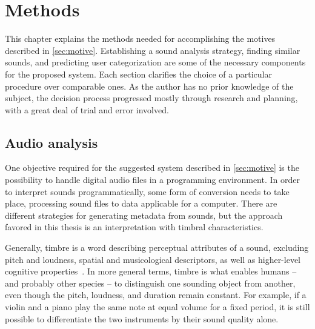 \bgroup{}

\chapter{Methods}\label{cha:methods}
This chapter explains the methods needed for accomplishing the motives described in \cref{sec:motive}. Establishing a sound analysis strategy, finding similar sounds, and predicting user categorization are some of the necessary components for the proposed system. Each section clarifies the choice of a particular procedure over comparable ones. As the author has no prior knowledge of the subject, the decision process progressed mostly through research and planning, with a great deal of trial and error involved.

\section{Audio analysis}\label{sec:audio_analysis}
One objective required for the suggested system described in \cref{sec:motive} is the possibility to handle digital audio files in a programming environment. In order to interpret sounds programmatically, some form of conversion needs to take place, processing sound files to data applicable for a computer. There are different strategies for generating metadata from sounds, but the approach favored in this thesis is an interpretation with timbral characteristics.

Generally, timbre is a word describing perceptual attributes of a sound, excluding pitch and loudness, spatial and musicological descriptors, as well as higher-level cognitive properties~\cite[7]{rep:d5.1}. In more general terms, timbre is what enables humans – and probably other species – to distinguish one sounding object from another, even though the pitch, loudness, and duration remain constant. For example, if a violin and a piano play the same note at equal volume for a fixed period, it is still possible to differentiate the two instruments by their sound quality alone.

